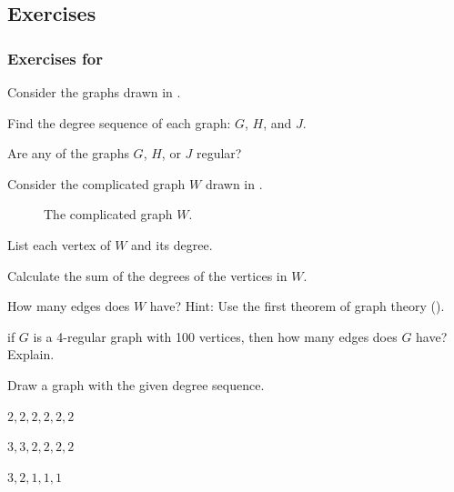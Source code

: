 
\subsection{Exercises}


\subsubsection*{Exercises for  \subdegseq}

\begin{exer}[\exerP] %
\label{exer_deg_seq}
    Consider the graphs drawn in .      
        \begin{exerpart}
            \item Find the degree sequence of each graph: $G$, $H$, and $J$.
            \item Are any of the graphs $G$, $H$, or $J$ regular?
        \end{exerpart}
\end{exer}

\begin{exer}[\exerP] %
\label{exer_count_edges}
    Consider the complicated graph $W$ drawn in .
        \begin{figure}[hbtp]
            \centering
            
            \caption{The complicated graph $W$.}
            \label{fig_graph_busy}
        \end{figure}
        \begin{apart}
            \item List each vertex of $W$ and its degree.
            \item Calculate the sum of the degrees of the vertices in $W$.
            \item How many edges does $W$ have?  Hint: Use the first theorem of graph theory ().
        \end{apart}
\end{exer}

\begin{exer} [\exerU] %
\label{exer_size_4reg}
if $G$ is a 4-regular graph with 100 vertices, then how many edges does $G$ have? Explain.
\end{exer}

\begin{exer}[\exerU] %
\label{exer_show_graphical}
    Draw a graph with the given degree sequence.
        \begin{exerpart}
            \item $2,2,2,2,2,2$
            \item $3,3,2,2,2,2$
            \item $3,2,1,1,1$
        \end{exerpart}
\end{exer}

